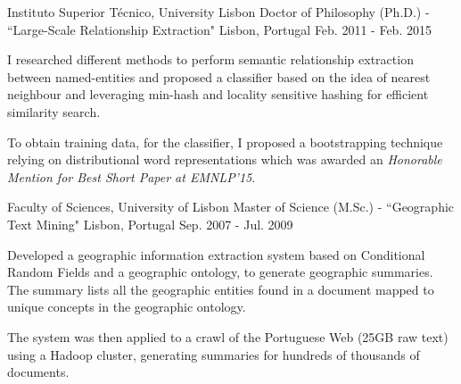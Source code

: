 

\begin{cventries}

  \cventry
    {Instituto Superior Técnico, University Lisbon} %
    {Doctor of Philosophy (Ph.D.) - ``Large-Scale Relationship Extraction"} %
    {Lisbon, Portugal} %
    {Feb. 2011 - Feb. 2015} %
    {
      \begin{cvitems} %
        \item {I researched different methods to perform semantic relationship extraction between named-entities and proposed a classifier based on the idea of nearest neighbour and leveraging min-hash and locality sensitive hashing for efficient similarity search.}
		\item {To obtain training data, for the classifier, I proposed a bootstrapping technique relying on distributional word representations which was awarded an {\it Honorable Mention for Best Short Paper at EMNLP'15}.}
      \end{cvitems}
    }


  \cventry
    {Faculty of Sciences, University of Lisbon} %
    {Master of Science (M.Sc.) - ``Geographic Text Mining"} %
    {Lisbon, Portugal} %
    {Sep. 2007 - Jul. 2009} %
    {
      \begin{cvitems} %
        \item {Developed a geographic information extraction system based on Conditional Random Fields and a geographic ontology, to generate geographic summaries. The summary lists all the geographic entities found in a document mapped to unique concepts in the geographic ontology.}
		\item {The system was then applied to a crawl of the Portuguese Web (25GB raw text) using a Hadoop cluster, generating summaries for hundreds of thousands of documents.}
      \end{cvitems}
    }


\end{cventries}
